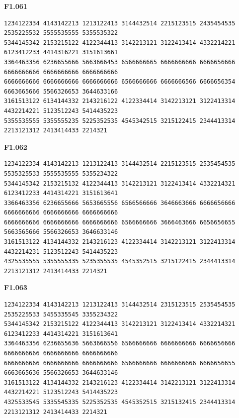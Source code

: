 \noindent\begin{minipage}{\linewidth}\textbf{F1.061}
\begin{lstlisting}
1234122334 4143142213 1213122413 3144432514 2215123515 2435454535 2535225532 5555535555 5355535322
5344145342 2153215122 4122344413 3142213121 3122413414 4332214221 6123412233 4414316221 3151613661
3364463356 6236655666 5663666453 6566666665 6666666666 6666656666 6666666666 6666666666 6666666666
6666666666 6666666666 6666666666 6566666666 6666666566 6666656354 6663665666 5566326653 3644633166
3161513122 6134144332 2143216122 4122334414 3142213121 3122413314 4432214221 5123512243 5414435223
5355535555 5355555235 5225352535 4545342515 3215122415 2344413314 2213121312 2413414433 2214321
\end{lstlisting}
\end{minipage}\par\smallskip

\noindent\begin{minipage}{\linewidth}\textbf{F1.062}
\begin{lstlisting}
1234122334 4143142213 1213122413 3144432514 2215123515 2535454535 5535325533 5555535555 5355234322
5344145342 2153215132 4122344413 3142213121 3122413414 4332214321 6123412233 4414314221 3151613641
3366463356 6236655666 5653665556 6566566666 3646663666 6666656666 6666666666 6666666666 6666666666
6666666666 6666666666 6666666666 6566666666 3666463666 6656656655 5663565666 5566326653 3646633146
3161513122 4134144332 2143216123 4122334414 3142213121 3122413314 4432214231 5123512243 5414435223
4325535555 5355555335 5235355535 4545352515 3215122415 2344413314 2213121312 2413414433 2214321
\end{lstlisting}
\end{minipage}\par\smallskip

\noindent\begin{minipage}{\linewidth}\textbf{F1.063}
\begin{lstlisting}
1234122334 4143142213 1213122413 3144432514 2315123515 2535454535 2535225533 5455335545 3355234322
5344145342 2153215122 4122344413 3142213121 3122413414 4332214321 6123412233 4414314221 3151613641
3364463356 6236655636 5663666556 6566666666 6666666666 6666656666 6666666666 6666666666 6666666666
6666666666 6666666666 6666666666 6566666666 6666666666 6666656655 6663665636 5566326653 3644633146
3161513122 4134144332 2143216123 4122334414 3142213121 3122413314 4432214221 5123512243 5414435223
4325533545 5335545335 5225352535 4545352515 3215132415 2344413314 2213121312 2413414433 2214321
\end{lstlisting}
\end{minipage}\par\smallskip

